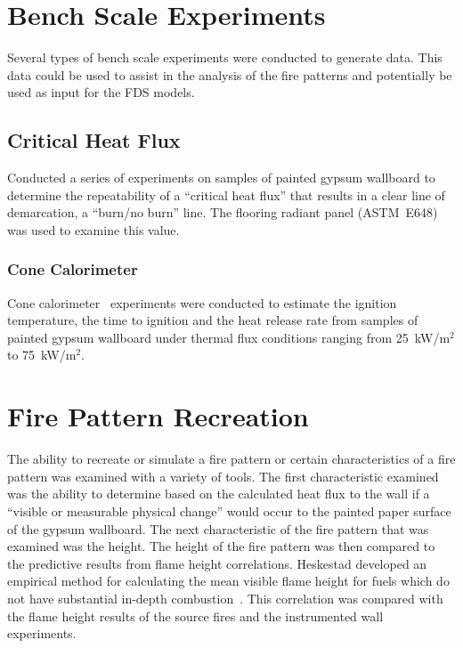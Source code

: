 \documentclass[twoside]{uocthesis}
\begin{document}
{\section{Bench Scale Experiments}

Several types of bench scale experiments were conducted to generate data. This data could be used to assist in the analysis of the fire patterns and potentially be used as input for the FDS models.

\subsection{Critical Heat Flux}

Conducted a series of experiments on samples of painted gypsum wallboard to determine the repeatability of a ``critical heat flux'' that results in a clear line of demarcation, a ``burn/no burn'' line.  The flooring radiant panel (ASTM~E648) was used to examine this value.

\subsubsection{Cone Calorimeter}

Cone calorimeter~\cite{ASTM_E1354} experiments were conducted to estimate the ignition temperature, the time to ignition and the heat release rate from samples of painted gypsum wallboard under thermal flux conditions ranging from 25~kW/m$^2$ to 75~kW/m$^2$.

\section{Fire Pattern Recreation}

The ability to recreate or simulate a fire pattern or certain characteristics of a fire pattern was examined with a variety of tools.  The first characteristic examined was the ability to determine based on the calculated heat flux to the wall if a ``visible or measurable physical change'' would occur to the painted paper surface of the gypsum wallboard.  The next characteristic of the fire pattern that was examined was the height.  The height of the fire pattern was then compared to the predictive results from flame height correlations. Heskestad developed an empirical method for calculating the mean visible flame height for fuels which do not have substantial in-depth combustion~\cite{Beyler:1986,Heskestad:SFPE}. This correlation was compared with the flame height results of the source fires and the instrumented wall experiments.

}
\end{document}
